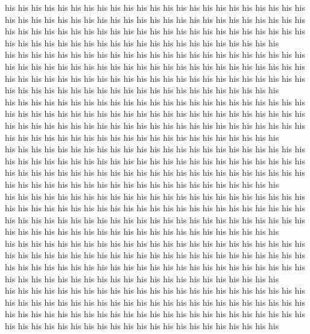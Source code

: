 his his his his his his his his his his his his his his his his his his his his his his his his his his his his his his his his his his his his his his his his his his his his his his his his his his his his his his his his his his his his his his his his his his his his his his his his his his his his his his his his his his his his his his his his his his\\
his his his his his his his his his his his his his his his his his his his his his his his his his his his his his his his his his his his his his his his his his his his his his his his his his his his his his his his his his his his his his his his his his his his his his his his his his his his his his his his his his his his his his his his his his his\\
his his his his his his his his his his his his his his his his his his his his his his his his his his his his his his his his his his his his his his his his his his his his his his his his his his his his his his his his his his his his his his his his his his his his his his his his his his his his his his his his his his his his his his his his his his\\
his his his his his his his his his his his his his his his his his his his his his his his his his his his his his his his his his his his his his his his his his his his his his his his his his his his his his his his his his his his his his his his his his his his his his his his his his his his his his his his his his his his his his his his his his his\\
his his his his his his his his his his his his his his his his his his his his his his his his his his his his his his his his his his his his his his his his his his his his his his his his his his his his his his his his his his his his his his his his his his his his his his his his his his his his his his his his his his his his his his his his his his\\
his his his his his his his his his his his his his his his his his his his his his his his his his his his his his his his his his his his his his his his his his his his his his his his his his his his his his his his his his his his his his his his his his his his his his his his his his his his his his his his his his his his his his his his his his his\\
his his his his his his his his his his his his his his his his his his his his his his his his his his his his his his his his his his his his his his his his his his his his his his his his his his his his his his his his his his his his his his his his his his his his his his his his his his his his his his his his his his his his his his his his his his\\
